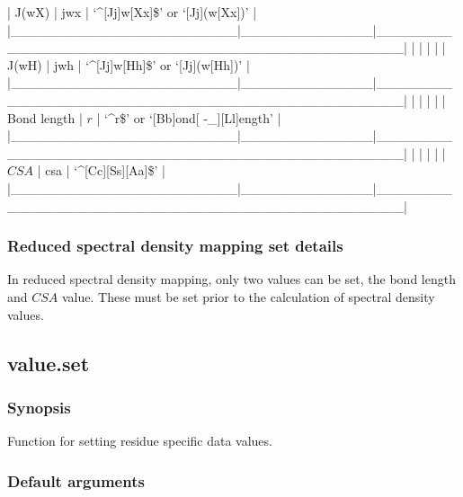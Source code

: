 | J(wX)                  | jwx          | `\^{}[Jj]w[Xx]\$' or `[Jj](w[Xx])'                   |
|\_\_\_\_\_\_\_\_\_\_\_\_\_\_\_\_\_\_\_\_\_\_\_\_|\_\_\_\_\_\_\_\_\_\_\_\_\_\_|\_\_\_\_\_\_\_\_\_\_\_\_\_\_\_\_\_\_\_\_\_\_\_\_\_\_\_\_\_\_\_\_\_\_\_\_\_\_\_\_\_\_\_\_\_\_\_\_\_\_|
|                        |              |                                                  |
| J(wH)                  | jwh          | `\^{}[Jj]w[Hh]\$' or `[Jj](w[Hh])'                   |
|\_\_\_\_\_\_\_\_\_\_\_\_\_\_\_\_\_\_\_\_\_\_\_\_|\_\_\_\_\_\_\_\_\_\_\_\_\_\_|\_\_\_\_\_\_\_\_\_\_\_\_\_\_\_\_\_\_\_\_\_\_\_\_\_\_\_\_\_\_\_\_\_\_\_\_\_\_\_\_\_\_\_\_\_\_\_\_\_\_|
|                        |              |                                                  |
| Bond length            | $r$            | `\^{}r\$' or `[Bb]ond[ -\_][Ll]ength'                 |
|\_\_\_\_\_\_\_\_\_\_\_\_\_\_\_\_\_\_\_\_\_\_\_\_|\_\_\_\_\_\_\_\_\_\_\_\_\_\_|\_\_\_\_\_\_\_\_\_\_\_\_\_\_\_\_\_\_\_\_\_\_\_\_\_\_\_\_\_\_\_\_\_\_\_\_\_\_\_\_\_\_\_\_\_\_\_\_\_\_|
|                        |              |                                                  |
| $CSA$                    | csa          | `\^{}[Cc][Ss][Aa]\$'                                 |
|\_\_\_\_\_\_\_\_\_\_\_\_\_\_\_\_\_\_\_\_\_\_\_\_|\_\_\_\_\_\_\_\_\_\_\_\_\_\_|\_\_\_\_\_\_\_\_\_\_\_\_\_\_\_\_\_\_\_\_\_\_\_\_\_\_\_\_\_\_\_\_\_\_\_\_\_\_\_\_\_\_\_\_\_\_\_\_\_\_|



\subsubsection{Reduced spectral density mapping set details}

In reduced spectral density mapping, only two values can be set, the bond length and $CSA$
value.  These must be set prior to the calculation of spectral density values.


\newpage

\subsection{value.set}


\subsubsection{Synopsis}

Function for setting residue specific data values.

\subsubsection{Default arguments}

